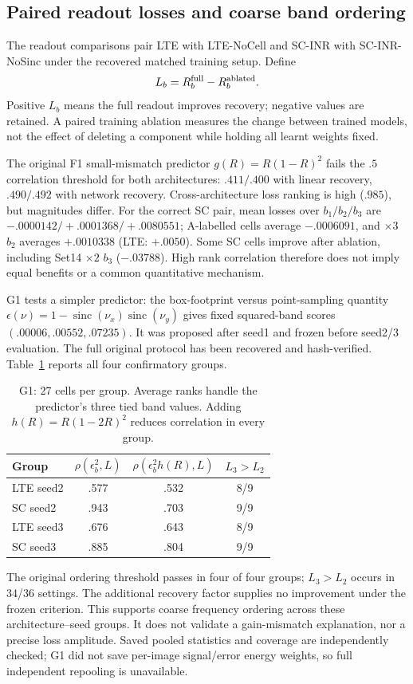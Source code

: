 \subsection{Paired readout losses and coarse band ordering}\label{sec:readout-main}
The readout comparisons pair LTE with LTE-NoCell and SC-INR with SC-INR-NoSinc under the recovered matched training setup. Define
\begin{equation}\label{eq:loss}
L_b=R_b^{\rm full}-R_b^{\rm ablated}.
\end{equation}
Positive $L_b$ means the full readout improves recovery; negative values are retained. A paired training ablation measures the change between trained models, not the effect of deleting a component while holding all learnt weights fixed.

The original F1 small-mismatch predictor $g(R)=R(1-R)^2$ fails the $.5$ correlation threshold for both architectures: $.411/.400$ with linear recovery, $.490/.492$ with network recovery. Cross-architecture loss ranking is high ($.985$), but magnitudes differ. For the correct SC pair, mean losses over $b_1/b_2/b_3$ are $-.0000142/+.0001368/+.0080551$; A-labelled cells average $-.0006091$, and $\times3$ $b_2$ averages $+.0010338$ (LTE: $+.0050$). Some SC cells improve after ablation, including Set14 $\times2$ $b_3$ ($-.03788$). High rank correlation therefore does not imply equal benefits or a common quantitative mechanism.

G1 tests a simpler predictor: the box-footprint versus point-sampling quantity $\epsilon(\nu)=1-\operatorname{sinc}(\nu_x)\operatorname{sinc}(\nu_y)$ gives fixed squared-band scores $(.00006,.00552,.07235)$. It was proposed after seed1 and frozen before seed2/3 evaluation. The full original protocol has been recovered and hash-verified. Table~\ref{tab:g1-main} reports all four confirmatory groups.

\begin{table}[t]\centering\small
\caption{G1: 27 cells per group. Average ranks handle the predictor's three tied band values. Adding $h(R)=R(1-2R)^2$ reduces correlation in every group.}\label{tab:g1-main}
\begin{tabular}{lccc}\toprule
Group & $\rho(\epsilon_b^2,L)$ & $\rho(\epsilon_b^2h(R),L)$ & $L_3>L_2$\\\midrule
LTE seed2 & .577 & .532 & 8/9\\
SC seed2 & .943 & .703 & 9/9\\
LTE seed3 & .676 & .643 & 8/9\\
SC seed3 & .885 & .804 & 9/9\\\bottomrule
\end{tabular}
\end{table}
The original ordering threshold passes in four of four groups; $L_3>L_2$ occurs in 34/36 settings. The additional recovery factor supplies no improvement under the frozen criterion. This supports coarse frequency ordering across these architecture--seed groups. It does not validate a gain-mismatch explanation, nor a precise loss amplitude. Saved pooled statistics and coverage are independently checked; G1 did not save per-image signal/error energy weights, so full independent repooling is unavailable.

